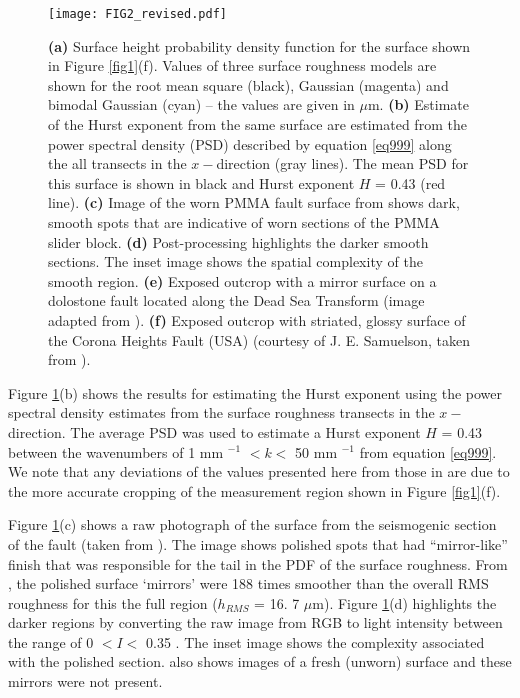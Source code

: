 \documentclass[preprint,1p, 10pt,authoryear]{elsarticle}
\begin{document}
\begin{figure}
	\centering
	\texttt{[image: FIG2\_revised.pdf]} 
	\caption{\textbf{(a)} Surface height probability density function for the surface shown in Figure \ref{fig1}(f). Values of three surface roughness models are shown for the root mean square (black), Gaussian (magenta) and bimodal Gaussian (cyan) -- the values are given in $\mu$m. \textbf{(b)} Estimate of the Hurst exponent from the same surface are estimated from the power spectral density (PSD) described by equation \eqref{eq999} along the all transects in the $x-$direction (gray lines). The mean PSD for this surface is shown in black and Hurst exponent $H$ = 0.43 (red line). \textbf{(c)} Image of the worn PMMA fault surface from \citep{Selvadurai2015b} shows dark, smooth spots that are indicative of worn sections of the PMMA slider block. \textbf{(d)} Post-processing highlights the darker smooth sections. The inset image shows the spatial complexity of the smooth region. \textbf{(e)} Exposed outcrop with a mirror surface on a dolostone fault located along the Dead Sea Transform (image adapted from \citet{Golberg2016}).  \textbf{(f)} Exposed outcrop with striated, glossy surface of the Corona Heights Fault (USA) (courtesy of J. E. Samuelson, taken from \citet{Verbena2019}).}
	\label{fig2}
\end{figure}
Figure \ref{fig2}(b) shows the results for estimating the Hurst exponent using the power spectral density estimates from the surface roughness transects in the $x-$direction. The average PSD was used to estimate a Hurst exponent $H$ = 0.43 between the wavenumbers of 1 mm $^{-1}$  $<k<$  50 mm $^{-1}$ from equation \eqref{eq999}. We note that any deviations of the values presented here from those in \citet{Selvadurai2017} are due to the more accurate cropping of the measurement region shown in Figure \ref{fig1}(f). 

Figure \ref{fig2}(c) shows a raw photograph of the surface from the seismogenic section of the fault (taken from \citet{Selvadurai2015b}). The image shows polished spots that had ``mirror-like'' finish that was responsible for the tail in the PDF of the surface roughness. From \citet{Selvadurai2017}, the polished surface `mirrors' were 188 times smoother than the overall RMS roughness for this the full region ($h_{RMS}$ = 16. 7 $\mu$m). Figure \ref{fig2}(d) highlights the darker regions by converting the raw image from RGB to light intensity between the range of 0 $< I <$ 0.35 \citep{Gonzales2004}. The inset image shows the complexity associated with the polished section. \citet[ch. 6, ][]{Selvadurai2015b} also shows images of a fresh (unworn) surface and these mirrors were not present.
\end{document}
